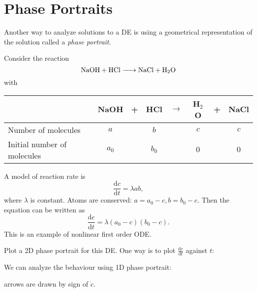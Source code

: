 \documentclass[10pt]{article}
\begin{document}
    \section{Phase Portraits}
    Another way to analyze solutions to a DE is using a geometrical representation of the solution called a \textit{phase portrait}.
    \begin{example}
        Consider the reaction
        \[
            \ce{NaOH + HCl -> NaCl + H_2O}
        \]
        with 
        \begin{center}
            \begin{tabular}{lccccccc}
              \toprule
              & NaOH & + & HCl & $\rightarrow$ & H$_2$O & + & NaCl \\
              \midrule
              Number of molecules & $a$ & & $b$ & & $c$ & & $c$ \\
              Initial number of molecules & $a_0$ & & $b_0$ & & $0$ & & $0$ \\
              \bottomrule
            \end{tabular}
          \end{center}
          A model of reaction rate is 
          \[
              \frac{\mathrm{d}c}{\mathrm{d}t}=\lambda ab 
          ,\]
          where $ \lambda $ is constant. Atoms are conserved: $ a=a_0-c, b=b_0-c $. Then the equation can be written as 
          \[
              \frac{\mathrm{d}c}{\mathrm{d}t}=\lambda(a_0-c)(b_0-c) 
          .\]
          This is an example of nonlinear first order ODE.

          Plot a 2D phase portrait for this DE. One way is to plot $ \frac{\mathrm{d}c}{\mathrm{d}t}  $ against $t$:
          \begin{center}
          \end{center}
          We can analyze the behaviour using 1D phase portrait:
          \begin{center}
          \end{center}
          arrows are drawn by sign of $ \dot{c} $.
    \end{example}
\end{document}
